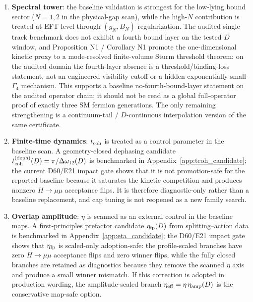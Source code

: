 \documentclass[aps,prd,onecolumn,notitlepage,nofootinbib,superscriptaddress,11pt,floatfix]{revtex4-2}
\begin{document}
\begin{enumerate}
    \item \textbf{Spectral tower}: the baseline validation is strongest for the low-lying bound sector ($N=1,2$ in the physical-gap scan), while the high-$N$ contribution is treated at EFT level through $(g_N,B_N)$ regularization. The audited single-track benchmark does not exhibit a fourth bound layer on the tested $D$ window, and Proposition N1 / Corollary N1 promote the one-dimensional kinetic proxy to a mode-resolved finite-volume Sturm threshold theorem: on the audited domain the fourth-layer absence is a threshold/binding-loss statement, not an engineered visibility cutoff or a hidden exponentially small-$\Gamma_4$ mechanism. This supports a baseline no-fourth-bound-layer statement on the audited operator chain; it should not be read as a global full-operator proof of exactly three SM fermion generations. The only remaining strengthening is a continuum-tail / $D$-continuous interpolation version of the same certificate.
    \item \textbf{Finite-time dynamics}: $t_{\rm coh}$ is treated as a control parameter in the baseline scan.  A geometry-closed dephasing candidate $t_{\rm coh}^{\rm(deph)}(D)=\pi/\Delta\omega_{12}(D)$ is benchmarked in Appendix~\ref{app:tcoh_candidate}; the current D60/E21 impact gate shows that it is not promotion-safe for the reported baseline because it saturates the kinetic competition and produces nonzero $H\to\mu\mu$ acceptance flips.  It is therefore diagnostic-only rather than a baseline replacement, and cap tuning is not reopened as a new family search.
    \item \textbf{Overlap amplitude}: $\eta$ is scanned as an external control in the baseline maps. A first-principles prefactor candidate $\eta_{\rm fp}(D)$ from splitting--action data is benchmarked in Appendix~\ref{app:eta_candidate}; the D60/E21 impact gate shows that \(\eta_{\rm fp}\) is scaled-only adoption-safe: the profile-scaled branches have zero $H\to\mu\mu$ acceptance flips and zero winner flips, while the fully closed branches are retained as diagnostics because they remove the scanned $\eta$ axis and produce a small winner mismatch. If this correction is adopted in production wording, the amplitude-scaled branch $\eta_{\rm eff}=\eta\,\eta_{\rm amp}(D)$ is the conservative map-safe option.

\end{enumerate}
\end{document}

